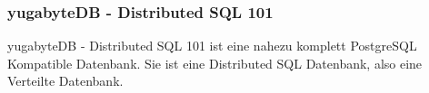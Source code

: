 
\subsubsection{yugabyteDB - Distributed SQL 101}
yugabyteDB - Distributed SQL 101 ist eine nahezu komplett \Gls{PostgreSQL} Kompatible Datenbank.
Sie ist eine Distributed SQL Datenbank, also eine Verteilte Datenbank\cite{ZXD6D9KU}.